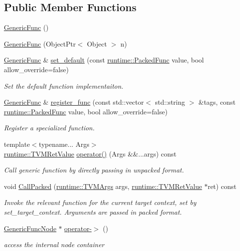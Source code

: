 \subsection*{Public Member Functions}
\begin{DoxyCompactItemize}
\item 
\hyperlink{classtvm_1_1GenericFunc_ae7363acf2a4a41ca5edb48a3f3537ba1}{Generic\+Func} ()
\item 
\hyperlink{classtvm_1_1GenericFunc_a355b52473c166484b944131937671d5f}{Generic\+Func} (Object\+Ptr$<$ Object $>$ n)
\item 
\hyperlink{classtvm_1_1GenericFunc}{Generic\+Func} \& \hyperlink{classtvm_1_1GenericFunc_a97c34a40c5059bdda64494d61f50602d}{set\+\_\+default} (const \hyperlink{classtvm_1_1runtime_1_1PackedFunc}{runtime\+::\+Packed\+Func} value, bool allow\+\_\+override=false)
\begin{DoxyCompactList}\small\item\em Set the default function implementaiton. \end{DoxyCompactList}\item 
\hyperlink{classtvm_1_1GenericFunc}{Generic\+Func} \& \hyperlink{classtvm_1_1GenericFunc_a2a5ef71cd38881b0ef73efa8f0b5fdc8}{register\+\_\+func} (const std\+::vector$<$ std\+::string $>$ \&tags, const \hyperlink{classtvm_1_1runtime_1_1PackedFunc}{runtime\+::\+Packed\+Func} value, bool allow\+\_\+override=false)
\begin{DoxyCompactList}\small\item\em Register a specialized function. \end{DoxyCompactList}\item 
{\footnotesize template$<$typename... Args$>$ }\\\hyperlink{classtvm_1_1runtime_1_1TVMRetValue}{runtime\+::\+T\+V\+M\+Ret\+Value} \hyperlink{classtvm_1_1GenericFunc_a1db58ce5213c9913379b42f3126a01b0}{operator()} (Args \&\&...args) const 
\begin{DoxyCompactList}\small\item\em Call generic function by directly passing in unpacked format. \end{DoxyCompactList}\item 
void \hyperlink{classtvm_1_1GenericFunc_a640deb0864ed3a59a0f2921de076a369}{Call\+Packed} (\hyperlink{classtvm_1_1runtime_1_1TVMArgs}{runtime\+::\+T\+V\+M\+Args} args, \hyperlink{classtvm_1_1runtime_1_1TVMRetValue}{runtime\+::\+T\+V\+M\+Ret\+Value} $\ast$ret) const 
\begin{DoxyCompactList}\small\item\em Invoke the relevant function for the current target context, set by set\+\_\+target\+\_\+context. Arguments are passed in packed format. \end{DoxyCompactList}\item 
\hyperlink{classtvm_1_1GenericFuncNode}{Generic\+Func\+Node} $\ast$ \hyperlink{classtvm_1_1GenericFunc_a4a04307dffa174f71cdfb08d1903dec2}{operator-\/$>$} ()
\begin{DoxyCompactList}\small\item\em access the internal node container \end{DoxyCompactList}\end{DoxyCompactItemize}
